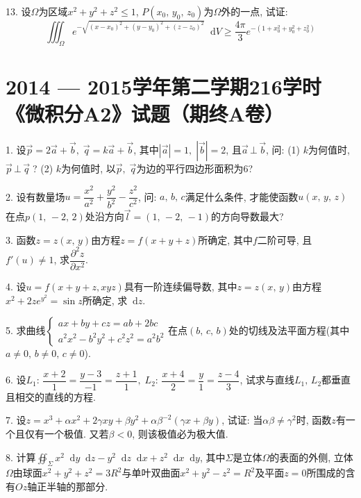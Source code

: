 \documentclass{article}
\newcommand*{\dif}{\mathop{}\!\mathrm{d}}
\begin{document}
13. 设$\Omega$为区域$x^2+y^2+z^2\leqslant 1$, $P(x_0,\,y_0,\,z_0)$为$\Omega$外的一点, 试证:
$$\iiint_\Omega{e^{-\sqrt{(x-x_0)^2+(y-y_0)^2+(z-z_0)^2}} \dif V} \geqslant \frac{4\pi}{3}e^{-(1+x_0^2+y_0^2+z_0^2)}$$

\newpage

\section*{2014 --- 2015学年第二学期216学时《微积分A2》试题（期终A卷）}
1. 设$\vec{p}=2\vec{a}+\vec{b},\; \vec{q}=k\vec{a}+\vec{b}$, 其中$|\vec{a}|=1,\; |\vec{b}|=2$, 且$\vec{a}\,\bot\, \vec{b}$, 问: (1) $k$为何值时, $\vec{p} \,\bot\, \vec{q}\;$? (2) $k$为何值时, 以$\vec{p},\; \vec{q}$为边的平行四边形面积为6?\par

2. 设有数量场$u=\dfrac{x^2}{a^2}+\dfrac{y^2}{b^2}-\dfrac{z^2}{c^2}$, 问: $a,\,b,\,c$满足什么条件, 才能使函数$u(x,\,y,\,z)$在点$p(1,\,-2,\,2)$处沿方向$\vec{l}=(1,\,-2,\,-1)$的方向导数最大?\par

3. 函数$z=z(x,\,y)$由方程$z=f(x+y+z)$所确定, 其中$f$二阶可导, 且$f'(u)\neq1$, 求$\dfrac{\partial^2 z}{\partial x^2}$.\par

4. 设$u=f(x+y+z, x y z)$具有一阶连续偏导数, 其中$z=z(x,\, y)$由方程$x^2+2z e^{y^2}=\sin z$所确定, 求$\dif z$.\par

5. 求曲线$\begin{cases}ax+by+cz=ab+2bc \\ a^2x^2-b^2y^2+c^2z^2=a^2b^2\end{cases}$在点$(b,\,c,\,b)$处的切线及法平面方程(其中$a\neq0,\, b\neq0,\, c\neq0$).\par

6. 设$L_1:\,\dfrac{x+2}{1}=\dfrac{y-3}{-1}=\dfrac{z+1}{1},\; L_2:\, \dfrac{x+4}{2}=\dfrac{y}{1}=\dfrac{z-4}{3}$, 试求与直线$L_1,\,L_2$都垂直且相交的直线的方程.\par

7. 设$z=x^3 + \alpha x^2 + 2\gamma xy + \beta y^2 + \alpha \beta^{-2}(\gamma x + \beta y)$, 试证: 当$\alpha \beta \neq \gamma^2$时, 函数$z$有一个且仅有一个极值. 又若$\beta < 0$, 则该极值必为极大值.\par

8. 计算$\displaystyle\oiint_\Sigma{x^2 \dif y \dif z - y^2 \dif z \dif x + z^2 \dif x \dif y}$, 其中$\Sigma$是立体$\Omega$的表面的外侧, 立体$\Omega$由球面$x^2+y^2+z^2=3R^2$与单叶双曲面$x^2+y^2-z^2=R^2$及平面$z=0$所围成的含有$Oz$轴正半轴的那部分.\par
\end{document}
